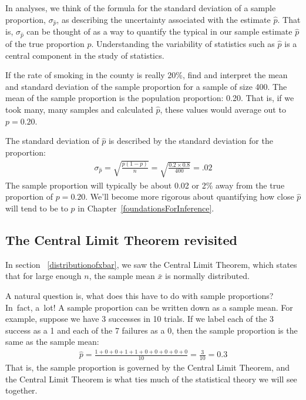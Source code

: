 In analyses, we think of the formula for the standard deviation of a sample proportion, $\sigma_{\hat{p}}$, as describing the uncertainty associated with the estimate $\hat{p}$. That is, $\sigma_{\hat{p}}$ can be thought of as a way to quantify the typical  in our sample estimate $\hat{p}$ of the true proportion $p$. Understanding the variability of statistics such as $\hat{p}$ is a central component in the study of statistics.


\begin{example}{If the rate of smoking in the county is really 20\%, find and interpret the mean and standard deviation of the sample proportion for a sample of size 400.}
The mean of the sample proportion is the population proportion: 0.20. That is, if we took many, many samples and calculated $\hat{p}$, these values would average out to $p = 0.20$.

The standard deviation of $\hat{p}$ is described by the standard deviation for the proportion:
\begin{align*}
\sigma_{\hat{p}}
	= \sqrt{\frac{p(1-p)}{n}}
	= \sqrt{\frac{0.2 \times 0.8}{400}}
	= .02
\end{align*}
The sample proportion will typically be about 0.02 or 2\% away from the true proportion of $p = 0.20$. We'll become more rigorous about quantifying how close $\hat{p}$ will tend to be to $p$ in Chapter~\ref{foundationsForInference}.
\end{example}

\subsection{The Central Limit Theorem revisited}

In section ~\ref{distributionofxbar}, we saw the Central Limit Theorem, which states that for large enough $n$, the sample mean $\bar{x}$ is normally distributed.

A natural question is, what does this have to do with sample proportions? In~fact, a~lot! A sample proportion can be written down as a sample mean. For example, suppose we have 3 successes in 10 trials. If we label each of the 3 success as a 1 and each of the 7 failures as a 0, then the sample proportion is the same as the sample mean:
\begin{align*}
\hat{p}
	= \frac{1 + 0 + 0 + 1 + 1 + 0 + 0 + 0 + 0 + 0}{10}
	= \frac{3}{10}
	= 0.3
\end{align*}
That is, the sample proportion is governed by the Central Limit Theorem, and the Central Limit Theorem is what ties much of the statistical theory we will see together.



